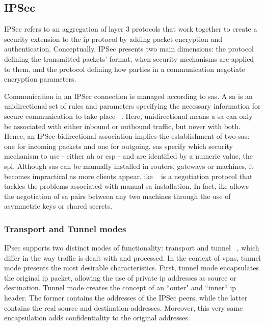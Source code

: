 \documentclass[11pt,twoside,a4paper]{report}
\begin{document}
\subsection{IPSec}

IPSec refers to an aggregation of layer 3 protocols that work together to create a security extension to the \ac{ip} protocol by adding packet encryption and authentication. Conceptually, IPSec presents two main dimensions: the protocol defining the transmitted packets' format, when security mechanisms are applied to them, and the protocol defining how parties in a communication negotiate encryption parameters.

Communication in an IPSec connection is managed according to \acp{sa}. A \ac{sa} is an unidirectional set of rules and parameters specifying the necessary information for secure communication to take place ~\cite{rfc4301}. Here, unidirectional means a \ac{sa} can only be associated with either inbound or outbound traffic, but never with both. Hence, an IPSec bidirectional association implies the establishment of two \acp{sa}: one for incoming packets and one for outgoing. \acp{sa} specify which security mechanism to use - either \ac{ah} or \ac{esp} - and are identified by a numeric value, the \ac{spi}. Although \ac{sa}s can be manually installed in routers, gateways or machines, it becomes impractical as more clients appear. \ac{ike} ~\cite{rfc7296} is a negotiation protocol that tackles the problems associated with manual \ac{sa} installation. In fact, \ac{ike} allows the negotiation of \ac{sa} pairs between any two machines through the use of asymmetric keys or shared secrets.

\subsubsection{Transport and Tunnel modes}

IPsec supports two distinct modes of functionality: transport and tunnel ~\cite{rfc4301}, which differ in the way traffic is dealt with and processed. In the context of \ac{vpn}s, tunnel mode presents the
most desirable characteristics. First, tunnel mode encapsulates the original \ac{ip} packet, allowing the use of private \ac{ip} addresses as source or destination. Tunnel mode creates the concept of an ``outer" and ``inner`` \ac{ip} header. The former contains the addresses of the IPSec peers, while the latter contains the real source and destination addresses. Moreover, this very same encapsulation adds confidentiality to the original addresses.
\end{document}
